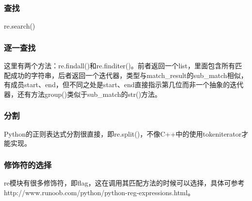 \documentclass[a4papaer,utf8,12pt,draft,titlepage]{ctexart}
\begin{document}
				\subsubsection{查找}
					re.search()
				\subsubsection{逐一查找}
					这里有两个方法：re.findall()和re.finditer()。前者返回一个list，里面包含所有匹配成功的字符串，后者返回一个迭代器，类型与match\_result的sub\_match相似，有成员start、end，但不同之处是start、end直接指示第几位而非一个抽象的迭代器，还有方法group()类似于sub\_match的str()方法。
				\subsubsection{分割}
					Python的正则表达式分割很直接，即re.split()，不像C++中的使用tokeniterator才能实现。
				\subsubsection{修饰符的选择}
					re模块有很多修饰符，即flag，这在调用其匹配方法的时候可以选择，具体可参考http://www.runoob.com/python/python-reg-expressions.html。
					
\end{document}
